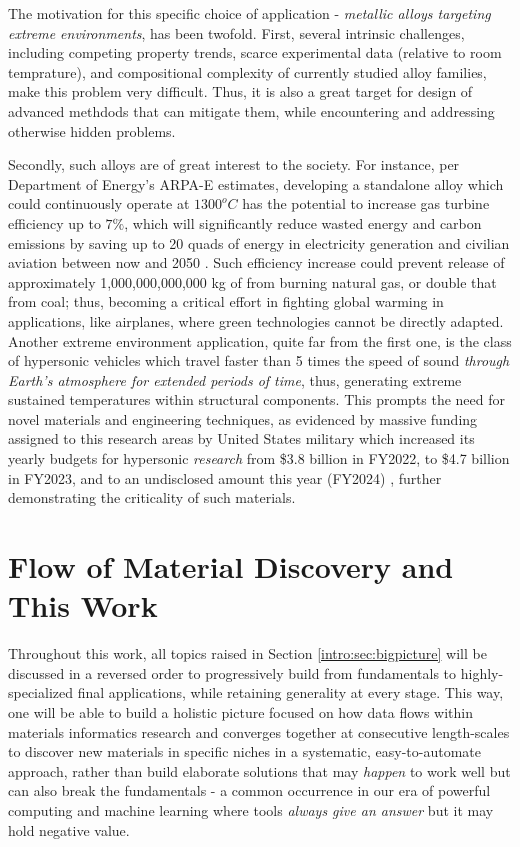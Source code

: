 The motivation for this specific choice of application - \emph{metallic alloys targeting extreme environments}, has been twofold. First, several intrinsic challenges, including competing property trends, scarce experimental data (relative to room temprature), and compositional complexity of currently studied alloy families, make this problem very difficult. Thus, it is also a great target for design of advanced methdods that can mitigate them, while encountering and addressing otherwise hidden problems.

Secondly, such alloys are of great interest to the society. For instance, per Department of Energy's ARPA-E estimates, developing a standalone alloy which could continuously operate at $1300^oC$ has the potential to increase gas turbine efficiency up to $7\%$, which will significantly reduce wasted energy and carbon emissions by saving up to 20 quads of energy in electricity generation and civilian aviation between now and 2050 \cite{ULTIMATEArpa-e.energy.gov}. Such efficiency increase could prevent release of approximately 1,000,000,000,000 kg of  from burning natural gas, or double that from coal; thus, becoming a critical effort in fighting global warming in applications, like airplanes, where green technologies cannot be directly adapted. Another extreme environment application, quite far from the first one, is the class of hypersonic vehicles which travel faster than 5 times the speed of sound \emph{through Earth's atmosphere for extended periods of time}, thus, generating extreme sustained temperatures within structural components. This prompts the need for novel materials and engineering techniques, as evidenced by massive funding assigned to this research areas by United States military which increased its yearly budgets for hypersonic \emph{research} from \$3.8 billion in FY2022, to \$4.7 billion in FY2023, and to an undisclosed amount this year (FY2024) \cite{Sayler2024HypersonicCongress}, further demonstrating the criticality of such materials.


\section{Flow of Material Discovery and This Work} \label{intro:sec:flow}

Throughout this work, all topics raised in Section \ref{intro:sec:bigpicture} will be discussed in a reversed order to progressively build from fundamentals to highly-specialized final applications, while retaining generality at every stage. This way, one will be able to build a holistic picture focused on how data flows within materials informatics research and converges together at consecutive length-scales to discover new materials in specific niches in a systematic, easy-to-automate approach, rather than build elaborate solutions that may \emph{happen} to work well but can also break the fundamentals - a common occurrence in our era of powerful computing and machine learning where tools \emph{always give an answer} but it may hold negative value.

